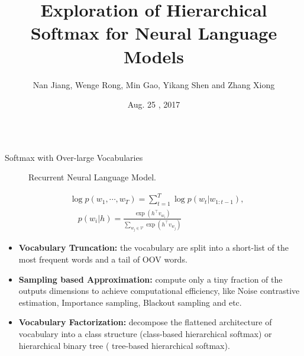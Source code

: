 \documentclass[final,t,unknownkeysallowed]{beamer}
\title{\Huge Exploration of Hierarchical Softmax for Neural Language Models}
\author{Nan Jiang, Wenge Rong, Min Gao, Yikang Shen and Zhang Xiong}
\institute[School of ECE]{Beihang University, Chongqing University and Universite de Montreal }
\date[Aug. 25 , 2017]{Aug. 25 , 2017}
\begin{document}
\begin{frame}{}
  \begin{columns}[t]
    \begin{column}{.3\linewidth}

      \begin{block}{Softmax with Over-large Vocabularies}
      \begin{figure}
      \caption{Recurrent Neural Language Model.}
      \end{figure}
      \begin{equation}\begin{split}
         &\log p(w_1,\cdots, w_T ) = \sum_{t=1}^T \log p(w_t | w_{1:t-1}), \\
         &\quad p(w_i|h)=\frac{\exp(h^\top v_{w_i})}{\sum_{w_j\in \mathcal{V}}{\exp(h^\top v_{w_j} )}}
    \end{split}
    \end{equation}
    \begin{itemize}
	\item \textbf{Vocabulary Truncation:}
    the vocabulary are split into a short-list of the most frequent words and a tail of OOV words.
	\item \textbf{Sampling based Approximation:}
    compute only a tiny fraction of the outputs dimensions to achieve computational efficiency, like Noise contrastive estimation, Importance sampling, Blackout sampling and etc.
	\item \textbf{Vocabulary Factorization:}
    decompose the flattened architecture of vocabulary into a class structure (class-based hierarchical softmax) or hierarchical binary tree ( tree-based hierarchical softmax).
    \end{itemize}
      \end{block}



\end{column}
\end{columns}
\end{frame}
\end{document}
